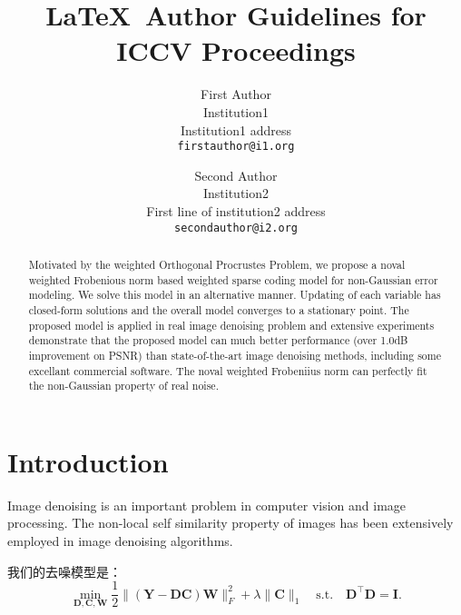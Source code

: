 \documentclass[10pt,twocolumn,letterpaper]{article}
\begin{document}
\title{\LaTeX\ Author Guidelines for ICCV Proceedings}

\author{First Author\\
Institution1\\
Institution1 address\\
{\tt\small firstauthor@i1.org}
\and
Second Author\\
Institution2\\
First line of institution2 address\\
{\tt\small secondauthor@i2.org}
}

\maketitle

\begin{abstract}
Motivated by the weighted Orthogonal Procrustes Problem, we propose a noval weighted Frobenious norm based weighted sparse coding model for non-Gaussian error modeling. We solve this model in an alternative manner. Updating of each variable has closed-form solutions and the overall model converges to a stationary point. The proposed model is applied in real image denoising problem and extensive experiments demonstrate that the proposed model can much better performance (over 1.0dB improvement on PSNR) than state-of-the-art image denoising methods, including some excellant commercial software. The noval weighted Frobeniius norm can perfectly fit the non-Gaussian property of real noise.
\end{abstract}

\section{Introduction}

Image denoising is an important problem in computer vision and image processing. The non-local self similarity property of images has been extensively employed in image denoising algorithms. 

我们的去噪模型是：
\begin{equation}
\min_{\mathbf{D},\mathbf{C},\mathbf{W}}\frac{1}{2}\|(\mathbf{Y}-\mathbf{D}\mathbf{C})\mathbf{W}\|_{F}^{2}
+
\lambda\|\mathbf{C}\|_{1}
\quad
\text{s.t.}
\quad
\mathbf{D}^{\top}\mathbf{D} =\mathbf{I}. 
\end{equation}
\end{document}
